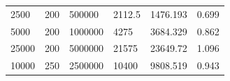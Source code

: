 \documentclass[11pt]{article}
\newcommand{\+}{\discretionary{\mbox{\scriptsize$\hookleftarrow$}}{}{}}
\begin{document}
\begin{table}[]
\begin{tabular}{|l|l|l|l|l||l|}
	2500                    & 200                               & 500000                    & 2112.5                        & 1476.193                 & 0.699                                  \\
	5000                    & 200                               & 1000000                   & 4275                          & 3684.329                 & 0.862                                  \\
	25000                   & 200                               & 5000000                   & 21575                         & 23649.72                 & 1.096                                  \\
	10000                   & 250                               & 2500000                   & 10400                         & 9808.519                 & 0.943                                 
\\	\hline
\end{tabular}
\end{table}
\end{document}
